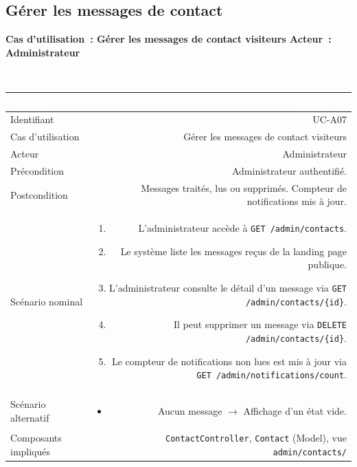\documentclass[a4paper,12pt]{article}
\newcommand{\ucheader}[2]{%
  \noindent\colorbox{capblue}{\parbox{\dimexpr\linewidth-2\fboxsep}{%
    \color{white}\bfseries\large Cas d'utilisation~: #1 \hfill \normalsize Acteur~: #2
  }}\\[2pt]
}
\begin{document}
\vspace{1em}

\subsection{Gérer les messages de contact}
\ucheader{Gérer les messages de contact visiteurs}{Administrateur}

\noindent
\begin{tabular}{|L|R|}
\hline
{}\textcolor{white}{\textbf{Champ}} & \textcolor{white}{\textbf{Description}} \\
\hline
{}Identifiant & UC-A07 \\
\hline
Cas d'utilisation & Gérer les messages de contact visiteurs \\
\hline
{}Acteur & Administrateur \\
\hline
Précondition & Administrateur authentifié. \\
\hline
{}Postcondition & Messages traités, lus ou supprimés. Compteur de notifications mis à jour. \\
\hline
Scénario nominal &
\begin{enumerate}
  \item L'administrateur accède à \texttt{GET /admin/contacts}.
  \item Le système liste les messages reçus de la landing page publique.
  \item L'administrateur consulte le détail d'un message via \texttt{GET /admin/contacts/\{id\}}.
  \item Il peut supprimer un message via \texttt{DELETE /admin/contacts/\{id\}}.
  \item Le compteur de notifications non lues est mis à jour via \texttt{GET /admin/notifications/count}.
\end{enumerate} \\
\hline
{}Scénario alternatif &
\begin{itemize}
  \item Aucun message $\rightarrow$ Affichage d'un état vide.
\end{itemize} \\
\hline
Composants impliqués & \texttt{ContactController}, \texttt{Contact} (Model), vue \texttt{admin/contacts/} \\
\hline
\end{tabular}
\end{document}
